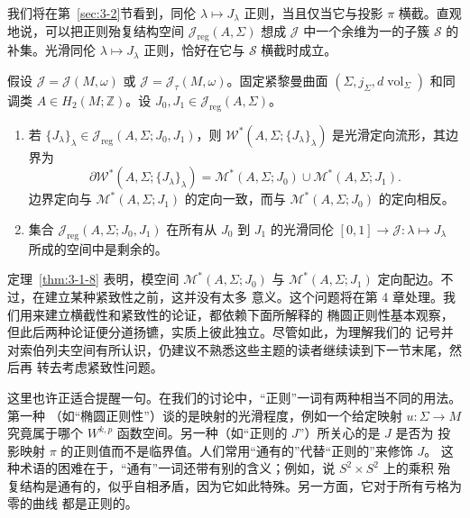 我们将在第~\ref{sec:3-2}节看到，同伦 $\lambda\mapsto J_\lambda$ 正则，当且仅当它与投影
$\pi$ 横截。直观地说，可以把正则殆复结构空间
$\mathcal J_{\mathrm{reg}}(A,\Sigma)$ 想成 $\mathcal J$ 中一个余维为一的子簇
$\mathcal S$ 的补集。光滑同伦 $\lambda\mapsto J_\lambda$ 正则，恰好在它与
$\mathcal S$ 横截时成立。

\begin{theorem}\label{thm:3-1-8}
假设 $\mathcal J=\mathcal J(M,\omega)$ 或
$\mathcal J=\mathcal J_\tau(M,\omega)$。固定紧黎曼曲面
$(\Sigma,j_\Sigma,d\operatorname{vol}_\Sigma)$ 和同调类
$A\in H_2(M;\mathbb Z)$。设
$J_0,J_1\in\mathcal J_{\mathrm{reg}}(A,\Sigma)$。
\begin{enumerate}[label=(\roman*),leftmargin=3em]
  \item 若
  $\{J_\lambda\}_\lambda\in
  \mathcal J_{\mathrm{reg}}(A,\Sigma;J_0,J_1)$，则
  $\mathcal W^*(A,\Sigma;\{J_\lambda\}_\lambda)$ 是光滑定向流形，其边界为
  \[
    \partial\mathcal W^*(A,\Sigma;\{J_\lambda\}_\lambda)
    =\mathcal M^*(A,\Sigma;J_0)\cup
    \mathcal M^*(A,\Sigma;J_1).
  \]
  边界定向与 $\mathcal M^*(A,\Sigma;J_1)$ 的定向一致，而与
  $\mathcal M^*(A,\Sigma;J_0)$ 的定向相反。

  \item 集合
  $\mathcal J_{\mathrm{reg}}(A,\Sigma;J_0,J_1)$
  在所有从 $J_0$ 到 $J_1$ 的光滑同伦
  $[0,1]\to\mathcal J:\lambda\mapsto J_\lambda$ 所成的空间中是剩余的。
\end{enumerate}
\end{theorem}

定理~\ref{thm:3-1-8} 表明，模空间
$\mathcal M^*(A,\Sigma;J_0)$ 与
$\mathcal M^*(A,\Sigma;J_1)$ 定向配边。不过，在建立某种紧致性之前，这并没有太多
意义。这个问题将在第 4 章处理。我们用来建立横截性和紧致性的论证，都依赖下面所解释的
椭圆正则性基本观察，但此后两种论证便分道扬镳，实质上彼此独立。尽管如此，为理解我们的
记号并对索伯列夫空间有所认识，仍建议不熟悉这些主题的读者继续读到下一节末尾，然后再
转去考虑紧致性问题。

\begin{remark}\label{rem:3-1-9}
这里也许正适合提醒一句。在我们的讨论中，“正则”一词有两种相当不同的用法。第一种
（如“椭圆正则性”）谈的是映射的光滑程度，例如一个给定映射 $u:\Sigma\to M$
究竟属于哪个 $W^{k,p}$ 函数空间。另一种（如“正则的 $J$”）所关心的是 $J$ 是否为
投影映射 $\pi$ 的正则值而不是临界值。人们常用“通有的”代替“正则的”来修饰 $J$。
这种术语的困难在于，“通有”一词还带有别的含义；例如，说 $S^2\times S^2$ 上的乘积
殆复结构是通有的，似乎自相矛盾，因为它如此特殊。另一方面，它对于所有亏格为零的曲线
都是正则的。
\end{remark}

